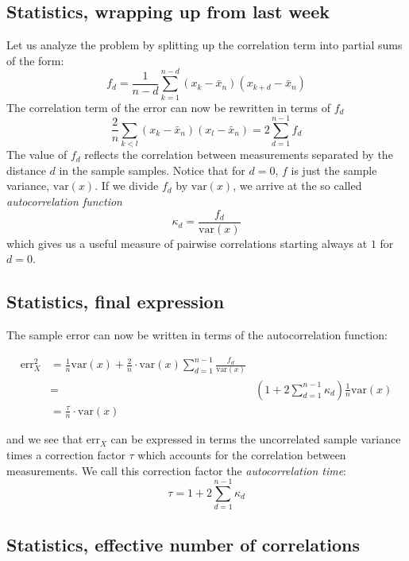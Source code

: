 \documentclass[%
oneside,                 %
final,                   %
10pt]{article}
\begin{document}
\noindent
\subsection*{Statistics, wrapping up from last week}

Let us analyze the problem by splitting up the correlation term into
partial sums of the form:
\[
f_d = \frac{1}{n-d}\sum_{k=1}^{n-d}(x_k - \bar x_n)(x_{k+d} - \bar x_n)
\]
The correlation term of the error can now be rewritten in terms of
$f_d$
\[
\frac{2}{n}\sum_{k<l} (x_k - \bar x_n)(x_l - \bar x_n) =
2\sum_{d=1}^{n-1} f_d
\]
The value of $f_d$ reflects the correlation between measurements
separated by the distance $d$ in the sample samples.  Notice that for
$d=0$, $f$ is just the sample variance, $\mathrm{var}(x)$. If we divide $f_d$
by $\mathrm{var}(x)$, we arrive at the so called \emph{autocorrelation function}
\[
\kappa_d = \frac{f_d}{\mathrm{var}(x)}
\]
which gives us a useful measure of pairwise correlations
starting always at $1$ for $d=0$.

\subsection*{Statistics, final expression}

The sample error can now be
written in terms of the autocorrelation function:

\begin{align}
\mathrm{err}_X^2 &=
\frac{1}{n}\mathrm{var}(x)+\frac{2}{n}\cdot\mathrm{var}(x)\sum_{d=1}^{n-1}
\frac{f_d}{\mathrm{var}(x)}\nonumber\\ &=&
\left(1+2\sum_{d=1}^{n-1}\kappa_d\right)\frac{1}{n}\mathrm{var}(x)\nonumber\\
&=\frac{\tau}{n}\cdot\mathrm{var}(x)
\end{align}

and we see that $\mathrm{err}_X$ can be expressed in terms the
uncorrelated sample variance times a correction factor $\tau$ which
accounts for the correlation between measurements. We call this
correction factor the \emph{autocorrelation time}:
\begin{equation}
\tau = 1+2\sum_{d=1}^{n-1}\kappa_d
\label{eq:autocorrelation_time}
\end{equation}

\subsection*{Statistics, effective number of correlations}
\end{document}
